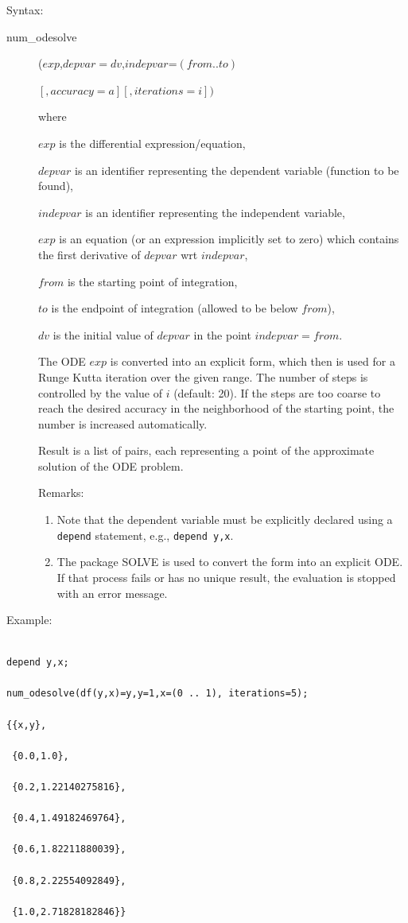 Syntax:
\begin{description}
\item[num\_odesolve]($exp$,$depvar=dv$,$indepvar$=$(from .. to)$

$                   [,accuracy=a][,iterations=i]) $

where

$exp$ is the differential expression/equation,

$depvar$ is an identifier representing the dependent variable
(function to be found),

$indepvar$ is an identifier representing the independent variable,

$exp$ is an equation (or an expression implicitly set to zero) which
contains the first derivative of $depvar$ wrt $indepvar$,

$from$ is the starting point of integration,

$to$ is the endpoint of integration (allowed to be below $from$),

$dv$ is the initial value of $depvar$ in the point $indepvar=from$.

The ODE $exp$ is converted into an explicit form, which then is
used for a Runge Kutta iteration over the given range. The
number of steps is controlled by the value of $i$
(default: 20).
If the steps are too coarse to reach the desired
accuracy in the neighborhood of the starting point, the number is
increased automatically.

Result is a list of pairs, each representing a point of the
approximate solution of the ODE problem.

Remarks:
\begin{enumerate}

  \item[--]
Note that the dependent variable must be explicitly declared
using a \texttt{depend} statement, e.g., \texttt{depend y,x}.
\item[--] The \REDUCE{} package \textsc{SOLVE} is used to convert the form into
an explicit ODE. If that process fails or has no unique result,
the evaluation is stopped with an error message.

\end{enumerate}

\end{description}

Example:
\begin{verbatim}

depend y,x;

num_odesolve(df(y,x)=y,y=1,x=(0 .. 1), iterations=5);

{{x,y},

 {0.0,1.0},

 {0.2,1.22140275816},

 {0.4,1.49182469764},

 {0.6,1.82211880039},

 {0.8,2.22554092849},

 {1.0,2.71828182846}}

\end{verbatim}


